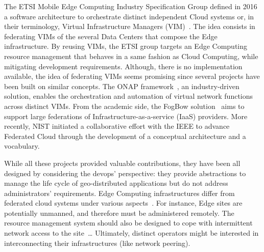 


%
The ETSI Mobile Edge Computing Industry Specification Group
defined in 2016 a software architecture to orchestrate distinct
independent Cloud systems or, in their terminology, Virtual
Infrastructure Managers (VIM)~\cite{7574435}.
%
The idea consists in federating VIMs of the several Data Centers that
compose the Edge infrastructure.  By reusing VIMs, the ETSI group targets an Edge
Computing resource management that behaves in a same fashion as Cloud
Computing, while mitigating development requirements.
%
Although, there is no implementation available, the idea of federating
VIMs seems promising since several projects have been built on similar
concepts. The ONAP framework~\cite{onap}, an industry-driven solution,
enables the orchestration and automation of virtual network functions
across distinct VIMs. From the academic side, the FogBow
solution~\cite{brasileiro2016fogbow} aims to support large federations
of Infrastructure-as-a-service (IaaS) providers. More recently, NIST
initiated a collaborative effort with the IEEE to advance Federated
Cloud through the development of a conceptual architecture and a
vocabulary.

While all these projects provided valuable contributions, they have
been all designed by considering the devops' perspective: they provide
abstractions to manage the life cycle of geo-distributed applications
but do not address administrators' requirements.
%
Edge Computing infrastructures differ from federated cloud systems
under various aspects~\cite{openstack:whitepaper}.  For instance, Edge
sites are potentially unmanned, and therefore must be administered
remotely. The resource management system should also be designed to
cope with intermittent network access to the site~\ldots
%
Ultimately, distinct operators might be interested in interconnecting their infrastructures (like network peering).
%

